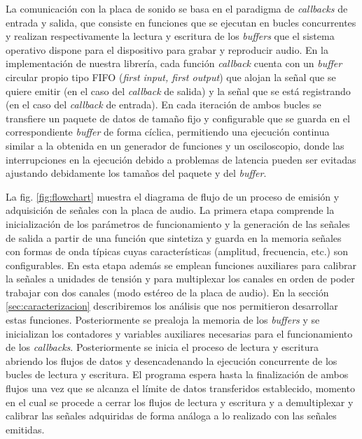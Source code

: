 \documentclass[a4paper,11pt]{article}
\begin{document}
	La comunicación con la placa de sonido se basa en el paradigma de \emph{callbacks} de entrada y salida, que consiste en funciones que se ejecutan en bucles concurrentes y realizan respectivamente la lectura y escritura de los \emph{buffers} que el sistema operativo dispone para el dispositivo para grabar y reproducir audio. En la implementación de nuestra librería, cada función \emph{callback} cuenta con un \emph{buffer} circular propio tipo FIFO (\emph{first input, first output}) que alojan la señal que se quiere emitir (en el caso del \emph{callback} de salida) y la señal que se está registrando (en el caso del \emph{callback} de entrada). En cada iteración de ambos bucles se transfiere un paquete de datos de tamaño fijo y configurable que se guarda en el correspondiente \emph{buffer} de forma cíclica, permitiendo una ejecución continua similar a la obtenida en un generador de funciones y un osciloscopio, donde las interrupciones en la ejecución debido a problemas de latencia pueden ser evitadas ajustando debidamente los tamaños del paquete y del \emph{buffer}.

	La fig. \ref{fig:flowchart} muestra el diagrama de flujo de un proceso de emisión y adquisición de señales con la placa de audio. La primera etapa comprende la inicialización de los parámetros de funcionamiento y la generación de las señales de salida a partir de una función que sintetiza y guarda en la memoria señales con formas de onda típicas cuyas características (amplitud, frecuencia, etc.) son configurables. En esta etapa además se emplean funciones auxiliares para calibrar la señales a unidades de tensión y para multiplexar los canales en orden de poder trabajar con dos canales (modo estéreo de la placa de audio). En la sección \ref{sec:caracterizacion} describiremos los análisis que nos permitieron desarrollar estas funciones. Posteriormente se prealoja la memoria de los \emph{buffers} y se inicializan los contadores y variables auxiliares necesarias para el funcionamiento de los \emph{callbacks}. Posteriormente se inicia el proceso de lectura y escritura abriendo los flujos de datos y desencadenando la ejecución concurrente de los bucles de lectura y escritura. El programa espera hasta la finalización de ambos flujos una vez que se alcanza el límite de datos transferidos establecido, momento en el cual se procede a cerrar los flujos de lectura y escritura y a demultiplexar y calibrar las señales adquiridas de forma análoga a lo realizado con las señales emitidas.
	
\end{document}
